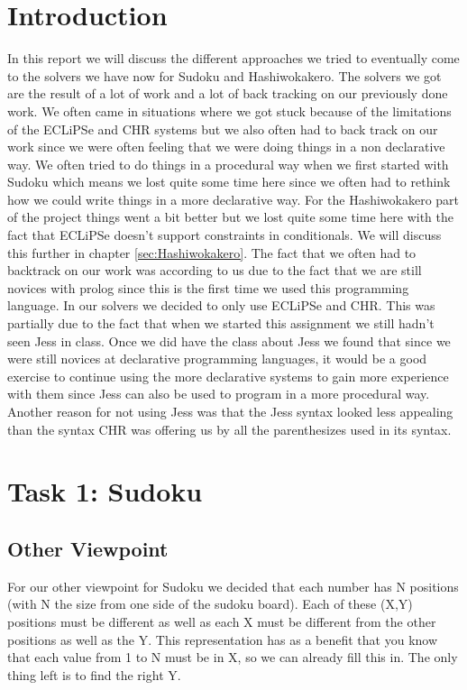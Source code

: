\documentclass{report}
\newcommand{\mychapter}[2]{
    \setcounter{chapter}{#1}
    \setcounter{section}{0}
    \chapter*{#2}
    \addcontentsline{toc}{chapter}{#2}
}
\begin{document}
\newpage
\tableofcontents
\newpage

\mychapter{0}{Introduction}
In this report we will discuss the different approaches we tried to eventually come to the solvers we have now for Sudoku and Hashiwokakero. The solvers we got are the result of a lot of work and a lot of back tracking on our previously done work. We often came in situations where we got stuck because of the limitations of the ECLiPSe and CHR systems but we also often had to back track on our work since we were often feeling that we were doing things in a non declarative way. We often tried to do things in a procedural way when we first started with Sudoku which means we lost quite some time here since we often had to rethink how we could write things in a more declarative way. For the Hashiwokakero part of the project things went a bit better but we lost quite some time here with the fact that ECLiPSe doesn't support constraints in conditionals. We will discuss this further in chapter \ref{sec:Hashiwokakero}. The fact that we often had to backtrack on our work was according to us due to the fact that we are still novices with prolog since this is the first time we used this programming language.
	\newline
	\newline
	In our solvers we decided to only use ECLiPSe and CHR. This was partially due to the fact that when we started this assignment we still hadn't seen Jess in class. Once we did have the class about Jess we found that since we were still novices at declarative programming languages, it would be a good exercise to continue using the more declarative systems to gain more experience with them since Jess can also be used to program in a more procedural way. Another reason for not using Jess was that the Jess syntax looked less appealing than the syntax CHR was offering us by all the parenthesizes used in its syntax.

\mychapter{1}{Task 1: Sudoku}
\section{Other Viewpoint}
\label{sec:other_viewpoint}
For our other viewpoint for Sudoku we decided that each number has N positions (with N the size from one side of the sudoku board). Each of these (X,Y) positions must be different as well as each X must be different from the other positions as well as the Y. This representation has as a benefit that you know that each value from 1 to N must be in X, so we can already fill this in. The only thing left is to find the right Y.
\newline
\newline
\end{document}
